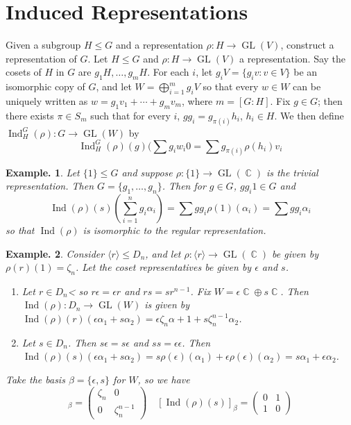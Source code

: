 \documentclass[11pt, a4paper]{memoir}
\DeclareMathOperator{\C}{{\mathbb{C}}}
\theoremstyle{change}
\theoremstyle{plain}
\theoremstyle{nonumberplain}
\newtheorem{example}{Example.}
\DeclareMathOperator{\GL}{GL}
\DeclareMathOperator{\Ind}{Ind}
\numberwithin{equation}{section}
\begin{document}
\section{Induced Representations}
Given a subgroup $H\leq G$ and a representation $\rho:H\to\GL(V)$, construct a representation of $G$.
Let $H\leq G$ and $\rho:H\to\GL(V)$ a representation.
Say the cosets of $H$ in $G$ are $g_1H,\ldots,g_mH$.
For each $i$, let $g_iV=\{g_iv:v\in V\}$ be an isomorphic copy of $G$, and let $W=\bigoplus_{i=1}^m g_iV$ so that every $w\in W$ can be uniquely written as $w=g_1v_1+\cdots+g_mv_m$, where $m=[G:H]$.
Fix $g\in G$; then there exists $\pi\in S_m$ such that for every $i$, $gg_i=g_{\pi(i)}h_i$, $h_i\in H$.
We then define $\Ind_H^G(\rho):G\to\GL(W)$ by
\begin{equation*}
    \Ind_H^G(\rho)(g)(\sum g_iw_i0=\sum g_{\pi(i)}\rho(h_i)v_i
\end{equation*}
\begin{example}
    Let $\{1\}\leq G$ and suppose $\rho:\{1\}\to\GL(\C)$ is the trivial representation.
    Then $G=\{g_1,\ldots,g_n\}$.
    Then for $g\in G$, $gg_i1\in G$ and
    \begin{equation*}
        \Ind(\rho)(s)\left(\sum_{i=1}^ng_i\alpha_i\right) = \sum gg_i\rho(1)(\alpha_i)=\sum gg_i\alpha_i
    \end{equation*}
    so that $\Ind(\rho)$ is isomorphic to the regular representation.
\end{example}
\begin{example}
    Consider $\langle r\rangle\leq D_n$, and let $\rho:\langle r\rangle\to\GL(\C)$ be given by $\rho(r)(1)=\zeta_n$.
    Let the coset representatives be given by $\epsilon$ and $s$.
    \begin{enumerate}[nl,r]
        \item Let $r\in D_n$< so $r\epsilon=\epsilon r$ and $rs=sr^{n-1}$.
            Fix $W=\epsilon\C\oplus s\C$.
            Then $\Ind(\rho):D_n\to\GL(W)$ is given by $\Ind(\rho)(r)(\epsilon\alpha_1+s\alpha_2)=\epsilon\zeta_n\alpha+1+s\zeta_n^{n-1}\alpha_2$.
        \item Let $s\in D_n$.
            Then $s\epsilon=s\epsilon$ and $ss=\epsilon\epsilon$.
            Then $\Ind(\rho)(s)(\epsilon\alpha_1+s\alpha_2)=s\rho(\epsilon)(\alpha_1)+\epsilon\rho(\epsilon)(\alpha_2)=s\alpha_1+\epsilon\alpha_2$.
    \end{enumerate}
    Take the basis $\beta=\{\epsilon,s\}$ for $W$, so we have
    \begin{equation*}
        [\Ind(\rho)(r)]_\beta=
        \begin{pmatrix}
            \zeta_n & 0\\
            0 & \zeta_n^{n-1}
        \end{pmatrix}
        \quad
        [\Ind(\rho)(s)]_\beta=
        \begin{pmatrix}
            0 & 1\\
            1 & 0
        \end{pmatrix}
    \end{equation*}
\end{example}
\end{document}

